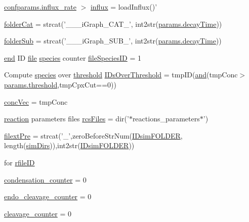 \begin{DoxyCompactItemize}
\hyperlink{a00071_ad795c71664f3161dc8f7a769341daadf}{confparams.\-influx\-\_\-rate} $>$ \hyperlink{a00028_a637d2af7e7b03600bcaf1931b999e3fc}{influx} = load\-Influx()'
\item 
\hyperlink{a00028_ac4793cb55101110d228ded89ce9caa48}{folder\-Cat} = strcat('\-\_\-\-\_\-\_\-i\-Graph\-\_\-\-C\-A\-T\-\_\-', int2str(\hyperlink{a00036_afb6aa83fb78c663f3b39be2380842a8b}{params.\-decay\-Time}))
\item 
\hyperlink{a00028_a05c5bf0305e5d58d4dc25bd89a025678}{folder\-Sub} = strcat('\-\_\-\-\_\-\_\-i\-Graph\-\_\-\-S\-U\-B\-\_\-', int2str(\hyperlink{a00036_afb6aa83fb78c663f3b39be2380842a8b}{params.\-decay\-Time}))
\item 
\hyperlink{a00025_afb358f48b1646c750fb9da6c6585be2b}{end} I\-D \hyperlink{a00068_a4e8353d6c62cf54bf4a1a8f63e56b8c3}{file} \hyperlink{a00022}{species} counter \hyperlink{a00028_aac959c2e94c26a03fa03966f9cec127e}{file\-Species\-I\-D} = 1
\item 
Compute \hyperlink{a00022}{species} over \hyperlink{a00036_aa022cbb28f80299d572def08e7a5ccfd}{threshold} \hyperlink{a00028_a67c695f856b6731644c6a128e602a323}{I\-Ds\-Over\-Threshold} = tmp\-I\-D(\hyperlink{a00028_a170f8acb213f91bf71c77b1d20bceb33}{and}(tmp\-Conc$>$\hyperlink{a00036_aa022cbb28f80299d572def08e7a5ccfd}{params.\-threshold},tmp\-Cpx\-Cut==0))
\item 
\hyperlink{a00028_a5cb5865443d8f156213280c070385e0d}{conc\-Vec} = tmp\-Conc
\item 
\hyperlink{a00028_a4ba2ecb46f808729569ecce2cc1d34c6}{reaction} parameters files \hyperlink{a00028_aa7a414dad4901fc05688608a49adfd7e}{rcs\-Files} = dir('$\ast$reactions\-\_\-parameters$\ast$')
\item 
\hyperlink{a00028_a527736a425f4f7ead2c2dc9d7b479346}{filext\-Pre} = strcat('\-\_\-',zero\-Before\-Str\-Num(\hyperlink{a00028_aeef3e34bd64eec758eac16f004cdcef0}{I\-Dsim\-F\-O\-L\-D\-E\-R}, length(\hyperlink{a00031_aae5035eb84b89176ed5b06e136325eff}{sim\-Dirs})),int2str(\hyperlink{a00028_aeef3e34bd64eec758eac16f004cdcef0}{I\-Dsim\-F\-O\-L\-D\-E\-R}))
\item 
for \hyperlink{a00028_a2773ef160060ce8adead229154219112}{rfile\-I\-D}
\item 
\hyperlink{a00028_adad395e0a0c736c2818d52c1100d4f31}{condensation\-\_\-counter} = 0
\item 
\hyperlink{a00028_aac101310701750e7d113b83271c1b982}{endo\-\_\-cleavage\-\_\-counter} = 0
\item 
\hyperlink{a00028_ab1f4c307f0935bb99adb3036a2936b5e}{cleavage\-\_\-counter} = 0

\end{DoxyCompactItemize}
